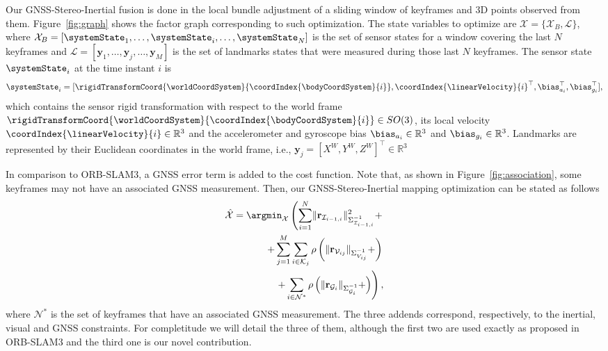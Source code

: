 Our GNSS-Stereo-Inertial fusion is done in the local bundle adjustment of a sliding window of keyframes and 3D points observed from them. Figure~\ref{fig:graph} shows the factor graph corresponding to such optimization. The state variables to optimize are $\mathcal{X} = \{\mathcal{X}_{B}, \mathcal{L}\}$, where $\mathcal{X}_{B} = [\systemState_{1},\dots,\systemState_{i},\dots,\systemState_{N}]$ is the set of sensor states for a window covering the last $N$ keyframes and $\mathcal{L}= [\mathbf{y}_{1},\dots,\mathbf{y}_{j},\dots,\mathbf{y}_{M}]$ is the set of landmarks states that were measured during those last $N$ keyframes. The sensor state $\systemState_{i}$ at the time instant $i$ is
%
\begin{equation}
    \systemState_{i} = [\rigidTransformCoord{\worldCoordSystem}{\coordIndex{\bodyCoordSystem}{i}}, \coordIndex{\linearVelocity}{i}^\top, \bias_{a_i}^\top, \bias_{g_i}^\top],
\end{equation}
%
which contains the sensor rigid transformation with respect to the world frame $\rigidTransformCoord{\worldCoordSystem}{\coordIndex{\bodyCoordSystem}{i}} \in SO(3)$, its local velocity $\coordIndex{\linearVelocity}{i} \in \mathbb{R}^3$ and the accelerometer and gyroscope bias $\bias_{a_i} \in \mathbb{R}^3$ and $\bias_{g_i} \in \mathbb{R}^3$. Landmarks are represented by their Euclidean coordinates in the world frame, i.e., $\mathbf{y}_{j} = [X^W, Y^W, Z^W]^\top \in \mathbb{R}^3$

In comparison to ORB-SLAM3, a GNSS error term is added to the cost function. Note that, as shown in Figure~\ref{fig:association}, some keyframes may not have an associated GNSS measurement. %
Then, our GNSS-Stereo-Inertial mapping optimization can be stated as follows
%
\begin{equation}
\begin{split}
    \hat{\mathcal{X}} = \argmin_{\mathcal{X}} \left( \sum_{i=1}^N \lVert \mathbf{r}_{\mathcal{I}_{i-1,i}}  \rVert^2_{\Sigma_{\mathcal{I}_{i-1,i}}^{-1}} +\right. \\ 
    \left. + \sum_{j=1}^M \sum_{i \in \mathcal{K}_j} \rho \left( \lVert \mathbf{r}_{\mathcal{V}_{ij}} \rVert_{\Sigma_{{V}_{ij}}^{-1}} +\right) \right. \\
    \left. + \sum_{i \in \mathcal{N}^*} \rho \left( \lVert \mathbf{r}_{\mathcal{G}_{i}} \rVert_{\Sigma_{\mathcal{G}_{i}}^{-1}} +\right) \right),
\end{split}
\end{equation}
%
where $\mathcal{N}^*$ is the set of keyframes that have an associated GNSS measurement. The three addends correspond, respectively, to the inertial, visual and GNSS constraints. For completitude we will detail the three of them, although the first two are used exactly as proposed in ORB-SLAM3 and the third one is our novel contribution.

